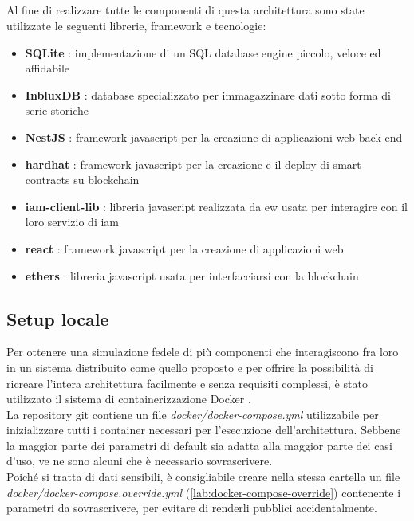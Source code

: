 \subsection{}
Al fine di realizzare tutte le componenti di questa architettura sono state utilizzate le seguenti librerie, framework e tecnologie:

\begin{itemize}
    \item \textbf{SQLite} \cite{sftw:sqlite}: implementazione di un SQL database engine piccolo, veloce ed affidabile
    \item \textbf{InbluxDB} \cite{sftw:influxdb}: database specializzato per immagazzinare dati sotto forma di serie storiche
    \item \textbf{NestJS} \cite{sftw:nestjs}: framework javascript per la creazione di applicazioni web back-end
    \item \textbf{hardhat} \cite{sftw:hardhat}: framework javascript per la creazione e il deploy di smart contracts su blockchain
    \item \textbf{iam-client-lib} \cite{sftw:iam-client-lib}: libreria javascript realizzata da \gls{ew} usata per interagire con il loro servizio di \gls{iam}
    \item \textbf{react} \cite{sftw:react}: framework javascript per la creazione di applicazioni web
    \item \textbf{ethers} \cite{sftw:ethers}: libreria javascript usata per interfacciarsi con la blockchain
\end{itemize}

\subsection{Setup locale}
Per ottenere una simulazione fedele di più componenti che interagiscono fra loro in un sistema distribuito come quello proposto e
per offrire la possibilità di ricreare l'intera architettura facilmente e senza requisiti complessi, è stato utilizzato il sistema di containerizzazione Docker \cite{sftw:docker}. \\
La repository git contiene un file \textit{docker/docker-compose.yml} utilizzabile per inizializzare tutti i container necessari per l'esecuzione dell'architettura.
Sebbene la maggior parte dei parametri di default sia adatta alla maggior parte dei casi d'uso, ve ne sono alcuni che è necessario sovrascrivere. \\
Poiché si tratta di dati sensibili, è consigliabile creare nella stessa cartella un file \textit{docker/docker-compose.override.yml} (\autoref{lab:docker-compose-override}) contenente i parametri da sovrascrivere,
per evitare di renderli pubblici accidentalmente.

